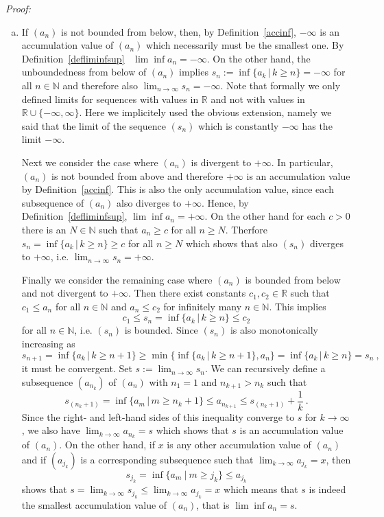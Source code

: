 {\em Proof:}
\begin{enumerate}[a)]
\item If $(a_n)$ is not bounded from below, then, by Definition~\ref{accinf}, $-\infty$ is an accumulation value of $(a_n)$ which necessarily must be
      the smallest one. By Definition~\ref{defliminfsup} \ $\lim\inf a_n=-\infty$. On the other hand, the unboundedness from below 
      of $(a_n)$ implies $s_n:=\inf\{a_k\,|\,k\geq n\}=-\infty$ for all $n\in\mathbb{N}$ and therefore also $\lim_{n\rightarrow \infty} s_n = -\infty$.
      Note that formally we only defined limits for sequences with values in $\mathbb{R}$ and not with values in $\mathbb{R}\cup\{-\infty,\infty\}$. 
      Here we implicitely used the obvious extension, namely we said that the limit of the sequence $(s_n)$ which is constantly
      $-\infty$ has the limit $-\infty$. 

      Next we consider the case where $(a_n)$ is divergent to $+\infty$. In particular, $(a_n)$ is not bounded from above and therefore $+\infty$
      is an accumulation value by Definition~\ref{accinf}. This is also the only accumulation value, since each subsequence 
      of $(a_n)$ also diverges to $+\infty$. Hence, by Definition~\ref{defliminfsup},  $\lim\inf a_n=+\infty$.
      On the other hand for each $c>0$ there is an $N\in\mathbb{N}$ such that $a_n\geq  c$ for all $n\geq N$. Therfore  
      $s_n=\inf\{a_k\,|\,k\geq n\}\geq c$ for all $n\geq N$ which shows that also $(s_n)$ diverges to $+\infty$, 
      i.e. $\lim_{n\rightarrow \infty} s_n = +\infty$. 

      Finally we consider the remaining case where $(a_n)$ is bounded from below and not divergent to $+\infty$. 
      Then there exist constants $c_1,c_2\in \mathbb{R}$ such that $c_1\leq a_n$ for all $n\in\mathbb{N}$ and $a_n\leq c_2$ for infinitely
      many $n\in\mathbb{N}$. This implies $$c_1\leq s_n=\inf\{a_k\,|\,k\geq n\} \leq c_2$$ for all $n\in\mathbb{N}$,  i.e. $(s_n)$ is bounded. 
      Since $(s_n)$ is also monotonically increasing as
      $$s_{n+1}=\inf\{a_k\,|\,k\geq n+1\} \geq \min\{\inf\{a_k\,|\,k\geq n+1\},a_{n}\} = \inf\{a_k\,|\,k\geq n\} = s_n \ ,$$
      it must be convergent. Set $s:=\lim_{n\rightarrow\infty}s_n$. We can recursively define a subsequence $(a_{n_k})$ of $(a_n)$ 
      with $n_1=1$ and $n_{k+1} > n_k$ such that $$s_{(n_k+1)} =\inf\{a_m\,|\,m\geq n_k+1\}\leq a_{n_{k+1}} \leq  s_{(n_{k}+1)}+\frac{1}{k} \ .$$ 
      Since the right- and left-hand sides of this inequality converge to $s$ for $k\rightarrow \infty$, 
      we also have $\lim_{k\rightarrow \infty} a_{n_{k}} = s$ which shows
      that $s$ is an accumulation value of $(a_n)$. On the other hand, if $x$ is any other accumulation value of $(a_n)$ and if 
      $(a_{j_k})$ is a corresponding subsequence such that $\lim_{k\rightarrow\infty}a_{j_k} = x$, then 
      $$s_{j_k}=\inf\{a_m~|~ m\geq j_k\} \leq a_{j_k}$$ shows that $s=\lim_{k\rightarrow\infty} s_{j_k} \leq \lim_{k\rightarrow\infty} a_{j_k}=x$
      which means that $s$ is indeed the smallest accumulation value of $(a_n)$, that is $\lim\inf a_n=s.$  


\end{enumerate}
